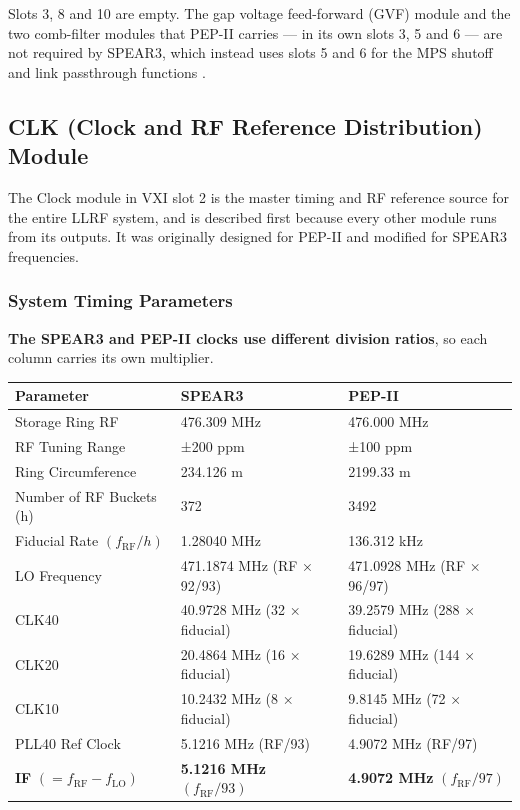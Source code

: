 Slots 3, 8 and 10 are empty. The gap voltage feed-forward (GVF) module and the two comb-filter modules that PEP-II carries --- in its own slots 3, 5 and 6 --- are not required by SPEAR3, which instead uses slots 5 and 6 for the MPS shutoff and link passthrough functions .

\subsection{CLK (Clock and RF Reference Distribution) Module}

The Clock module in VXI slot 2 is the master timing and RF reference source for the entire LLRF system, and is described first because every other module runs from its outputs. It was originally designed for PEP-II and modified for SPEAR3 frequencies.

\subsubsection{System Timing Parameters}\label{sec:timing-parameters}

\textbf{The SPEAR3 and PEP-II clocks use different division ratios}, so each column carries its own multiplier.

\begin{longtable}[]{@{}lll@{}}
\toprule\noalign{}
Parameter & SPEAR3 & PEP-II \\
\midrule\noalign{}
\endhead
\bottomrule\noalign{}
\endlastfoot
Storage Ring RF & 476.309 MHz & 476.000 MHz \\
RF Tuning Range & ±200 ppm & ±100 ppm \\
Ring Circumference & 234.126 m & 2199.33 m \\
Number of RF Buckets (h) & 372 & 3492 \\
Fiducial Rate $(f_\text{RF}/h)$ & 1.28040 MHz & 136.312 kHz \\
LO Frequency & 471.1874 MHz (RF × 92/93) & 471.0928 MHz (RF × 96/97) \\
CLK40 & 40.9728 MHz (32 × fiducial) & 39.2579 MHz (288 × fiducial) \\
CLK20 & 20.4864 MHz (16 × fiducial) & 19.6289 MHz (144 × fiducial) \\
CLK10 & 10.2432 MHz (8 × fiducial) & 9.8145 MHz (72 × fiducial) \\
PLL40 Ref Clock & 5.1216 MHz (RF/93) & 4.9072 MHz (RF/97) \\
\textbf{IF} $(= f_\text{RF} - f_\text{LO})$ & \textbf{5.1216 MHz} $(f_\text{RF}/93)$ & \textbf{4.9072 MHz} $(f_\text{RF}/97)$ \\
\end{longtable}

